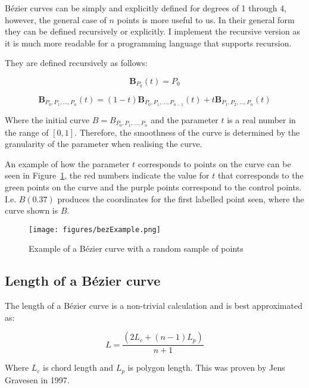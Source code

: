 Bézier curves can be simply and explicitly defined for degrees of 1 through 4, however, the general case of $n$ points is more useful to us. In their general form they can be defined recursively or explicitly. I implement the recursive version as it is much more readable for a programming language that supports recursion.

They are defined recursively as follows:

\begin{equation}
    \textbf{B}_{P_0}(t) = P_0
\end{equation}

\begin{equation}
    \textbf{B}_{P_0,P_1,\ldots,P_n}(t) = (1-t)\textbf{B}_{P_0,P_1,\ldots,P_{n-1}}(t) + t\textbf{B}_{P_1,P_2,\ldots,P_n}(t)
  \end{equation}

  Where the initial curve $B = B_{P_{0},P_{1},\ldots,P_{n}}$ and the parameter $t$ is a real number in the range of $[0,1]$. Therefore, the smoothness of the curve is determined by the granularity of the parameter when realising the curve.

An example of how the parameter $t$ corresponds to points on the curve can be seen in Figure~\ref{fig:bezexample}, the red numbers indicate the value for $t$ that corresponds to the green points on the curve and the purple points correspond to the control points. I.e. $B(0.37)$ produces the coordinates for the first labelled point seen, where the curve shown is $B$.

\begin{figure}[ht]
  \centering
  \texttt{[image: figures/bezExample.png]}
  \caption{\label{fig:bezexample} Example of a Bézier  curve with a random sample of points}
\end{figure}


\subsection{Length of a Bézier curve}
\label{subsec:back-bez-length}

The length of a Bézier curve is a non-trivial calculation and is best approximated as:

\begin{equation}
    L = \frac{(2L_c + (n-1)L_p)}{n+1}
\end{equation}

Where $L_c$ is chord length and $L_p$ is polygon length. This was proven by Jens Gravesen\cite{gravesenAdaptiveSubdivisionLength1997} in 1997.

